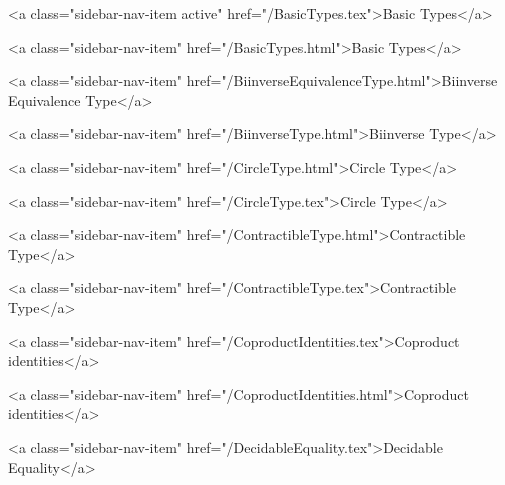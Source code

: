          <a class="sidebar-nav-item active" href="/BasicTypes.tex">Basic Types</a>
        
      
    
      
        
          <a class="sidebar-nav-item" href="/BasicTypes.html">Basic Types</a>
        
      
    
      
        
          <a class="sidebar-nav-item" href="/BiinverseEquivalenceType.html">Biinverse Equivalence Type</a>
        
      
    
      
        
          <a class="sidebar-nav-item" href="/BiinverseType.html">Biinverse Type</a>
        
      
    
      
        
          <a class="sidebar-nav-item" href="/CircleType.html">Circle Type</a>
        
      
    
      
        
          <a class="sidebar-nav-item" href="/CircleType.tex">Circle Type</a>
        
      
    
      
        
          <a class="sidebar-nav-item" href="/ContractibleType.html">Contractible Type</a>
        
      
    
      
        
          <a class="sidebar-nav-item" href="/ContractibleType.tex">Contractible Type</a>
        
      
    
      
        
          <a class="sidebar-nav-item" href="/CoproductIdentities.tex">Coproduct identities</a>
        
      
    
      
        
          <a class="sidebar-nav-item" href="/CoproductIdentities.html">Coproduct identities</a>
        
      
    
      
        
          <a class="sidebar-nav-item" href="/DecidableEquality.tex">Decidable Equality</a>
        
      
    
